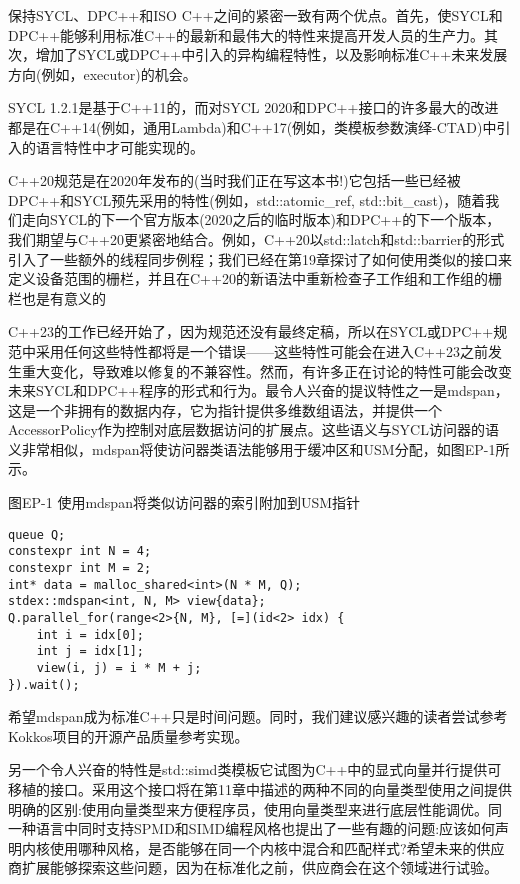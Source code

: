 保持SYCL、DPC++和ISO C++之间的紧密一致有两个优点。首先，使SYCL和DPC++能够利用标准C++的最新和最伟大的特性来提高开发人员的生产力。其次，增加了SYCL或DPC++中引入的异构编程特性，以及影响标准C++未来发展方向(例如，executor)的机会。\par

SYCL 1.2.1是基于C++11的，而对SYCL 2020和DPC++接口的许多最大的改进都是在C++14(例如，通用Lambda)和C++17(例如，类模板参数演绎-CTAD)中引入的语言特性中才可能实现的。\par

C++20规范是在2020年发布的(当时我们正在写这本书!)它包括一些已经被DPC++和SYCL预先采用的特性(例如，std::atomic\_ref, std::bit\_cast)，随着我们走向SYCL的下一个官方版本(2020之后的临时版本)和DPC++的下一个版本，我们期望与C++20更紧密地结合。例如，C++20以std::latch和std::barrier的形式引入了一些额外的线程同步例程；我们已经在第19章探讨了如何使用类似的接口来定义设备范围的栅栏，并且在C++20的新语法中重新检查子工作组和工作组的栅栏也是有意义的\par

C++23的工作已经开始了，因为规范还没有最终定稿，所以在SYCL或DPC++规范中采用任何这些特性都将是一个错误——这些特性可能会在进入C++23之前发生重大变化，导致难以修复的不兼容性。然而，有许多正在讨论的特性可能会改变未来SYCL和DPC++程序的形式和行为。最令人兴奋的提议特性之一是mdspan，这是一个非拥有的数据内存，它为指针提供多维数组语法，并提供一个AccessorPolicy作为控制对底层数据访问的扩展点。这些语义与SYCL访问器的语义非常相似，mdspan将使访问器类语法能够用于缓冲区和USM分配，如图EP-1所示。\par

\hspace*{\fill} \par %
图EP-1 使用mdspan将类似访问器的索引附加到USM指针
\begin{lstlisting}[caption={}]
queue Q;
constexpr int N = 4;
constexpr int M = 2;
int* data = malloc_shared<int>(N * M, Q);
stdex::mdspan<int, N, M> view{data};
Q.parallel_for(range<2>{N, M}, [=](id<2> idx) {
	int i = idx[0];
	int j = idx[1];
	view(i, j) = i * M + j;
}).wait();
\end{lstlisting}

希望mdspan成为标准C++只是时间问题。同时，我们建议感兴趣的读者尝试参考Kokkos项目的开源产品质量参考实现。\par

另一个令人兴奋的特性是std::simd类模板它试图为C++中的显式向量并行提供可移植的接口。采用这个接口将在第11章中描述的两种不同的向量类型使用之间提供明确的区别:使用向量类型来方便程序员，使用向量类型来进行底层性能调优。同一种语言中同时支持SPMD和SIMD编程风格也提出了一些有趣的问题:应该如何声明内核使用哪种风格，是否能够在同一个内核中混合和匹配样式?希望未来的供应商扩展能够探索这些问题，因为在标准化之前，供应商会在这个领域进行试验。\par


















